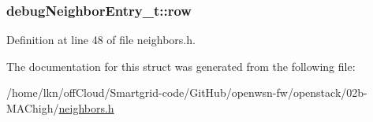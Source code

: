 \subsubsection[{\texorpdfstring{row}{row}}]{ debug\+Neighbor\+Entry\+\_\+t\+::row}\hypertarget{structdebug_neighbor_entry__t_ab393c4e54604336bb6f9d4da65aabf62}{}\label{structdebug_neighbor_entry__t_ab393c4e54604336bb6f9d4da65aabf62}


Definition at line 48 of file neighbors.\+h.



The documentation for this struct was generated from the following file\+:\begin{DoxyCompactItemize}
\item 
/home/lkn/off\+Cloud/\+Smartgrid-\/code/\+Git\+Hub/openwsn-\/fw/openstack/02b-\/\+M\+A\+Chigh/\hyperlink{neighbors_8h}{neighbors.\+h}\end{DoxyCompactItemize}

